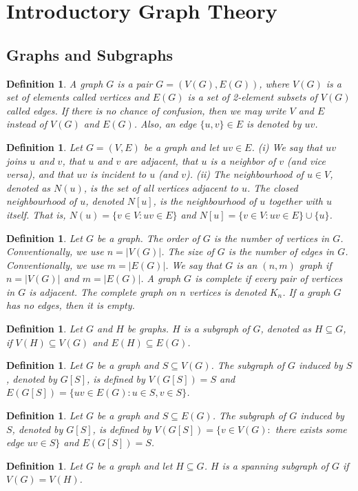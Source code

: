 \documentclass[11pt]{article}
\newtheorem{definition}[theorem]{Definition}
\begin{document}
\section{Introductory Graph Theory}
\subsection{Graphs and Subgraphs}
\begin{definition}
A graph $G$ is a pair $G = (V (G), E(G))$, where $V (G)$ is a set of elements called vertices and $E(G)$ is a set of 2-element subsets of $V (G)$ called edges. 
If there is no chance of confusion, then we may write $V$ and $E$ instead of $V(G)$ and $E(G)$. Also, an edge $\{u,v\}\in E$ is denoted by $uv$.
\end{definition}
\begin{definition}
Let $G=(V,E)$ be a graph and let $uv\in E$. 
\noindent (i) We say that $uv$ joins $u$ and $v$, that $u$ and $v$ are adjacent, that $u$ is a neighbor of $v$ (and vice versa), and that $uv$ is incident to $u$ (and $v$). 
\noindent (ii) The neighbourhood of $u \in V$, denoted as $N(u)$, is the set of all vertices adjacent to $u$. The closed neighbourhood of $u$, denoted $N[u]$, is the neighbourhood of $u$ together with $u$ itself. That is,
$N(u)=\{v\in V: uv\in E\}$ and $N[u]=\{v\in V: uv\in E\}\cup\{u\}$.
\end{definition}
\begin{definition}
Let $G$ be a graph. The order of $G$ is the number of vertices in $G$. Conventionally, we use $n=|V(G)|$. The size of $G$ is the number of edges in $G$. Conventionally, we use $m=|E(G)|$. We say that $G$ is an $(n,m)$ graph if $n=|V(G)|$ and $m=|E(G)|$. 
A graph $G$ is complete if every pair of vertices in $G$ is adjacent. The complete graph on $n$ vertices is denoted $K_n$. If a graph $G$ has no edges, then it is empty.
\end{definition}
\begin{definition}
Let $G$ and $H$ be graphs. $H$ is a subgraph of $G$, denoted as $H\subseteq G$, if $V(H)\subseteq V(G)$ and $E(H)\subseteq E(G)$.
\end{definition}
\begin{definition}
Let $G$ be a graph and $S\subseteq V(G)$. The subgraph of $G$ induced by $S$, denoted by $G[S]$, is defined by $V(G[S])=S$ and $E(G[S])=\{uv\in E(G): u\in S, v\in S\}$. 
\end{definition}
\begin{definition}
Let $G$ be a graph and $S\subseteq E(G)$. The subgraph of $G$ induced by $S$, denoted by $G[S]$, is defined by $V(G[S])=\{v\in V(G):$ there exists some edge $uv\in S\}$ and $E(G[S])=S$.
\end{definition}
\begin{definition}
Let $G$ be a graph and let $H\subseteq G$. $H$ is a spanning subgraph of $G$ if $V(G)=V(H)$.
\end{definition}
\end{document}
